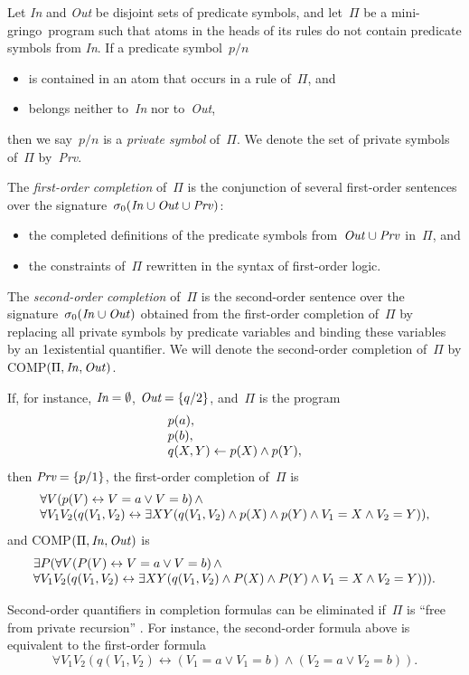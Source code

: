 \documentclass{new_tlp}
\def\ar{\leftarrow}
\def\lrar{\leftrightarrow}
\def\ba{\begin{array}}
\def\ea{\end{array}}
\def\gringo{{\sc gringo}}
\begin{document}
Let \emph{In} and \emph{Out} be disjoint sets of predicate symbols, and
let~$\Pi$ be a mini-\gringo\ program such that atoms in the heads of
its rules do not contain predicate symbols from \emph{In}.
If a predicate symbol~$p/n$
\begin{itemize}
\item is contained in an atom that occurs in a rule of~$\Pi$, and
\item belongs neither to~\emph{In} nor to~\emph{Out},
\end{itemize}
then we say~$p/n$ is a \emph{private symbol} of~$\Pi$.  We denote the
set of private symbols of~$\Pi$ by~\emph{Prv}.

The \emph{first-order completion} of~$\Pi$ is the conjunction of several
first-order sentences over the
signature~$\sigma_0(\emph{In\/}\cup\emph{Out\/}\cup\emph{Prv\/})$:
\begin{itemize}
\item the completed definitions of the predicate symbols
  from~$\emph{Out\/}\cup\emph{Prv\/}$ in~$\Pi$, and
\item the constraints of~$\Pi$ rewritten in the syntax of first-order
  logic.
\end{itemize}
The \emph{second-order completion} of~$\Pi$ is the second-order sentence
over the signature~$\sigma_0(\emph{In\/}\cup\emph{Out\/})$ obtained from
the first-order completion of~$\Pi$ by replacing all private symbols by
predicate variables and binding these variables by an 1existential quantifier.
We will denote the second-order completion of~$\Pi$ by
COMP$(\Pi,\emph{In\/},\emph{Out\/})$.

If, for instance, $\emph{In}=\emptyset$, $\emph{Out}=\{q/2\}$, and~$\Pi$
is the program
$$
\ba l
p(a),\\
p(b),\\
q(X,Y) \ar p(X) \land p(Y),
\ea$$
then $\emph{Prv}=\{p/1\}$,
the first-order completion of~$\Pi$ is
$$\ba l
\forall V(p(V) \lrar V=a \lor V=b)\,\land\\
\forall V_1V_2(q(V_1,V_2) \lrar \exists XY(q(V_1,V_2) \land p(X) \land p(Y)
\land V_1=X \land V_2=Y)),
\ea$$
and COMP$(\Pi,\emph{In\/},\emph{Out\/})$ is
$$
\ba l
\exists P(\forall V(P(V) \lrar V=a \lor V=b)\,\land\\
\forall V_1V_2(q(V_1,V_2) \lrar \exists XY(q(V_1,V_2) \land
P(X) \land P(Y) \land V_1=X \land V_2=Y))).
\ea
$$

Second-order quantifiers in completion formulas can be eliminated if~$\Pi$
is ``free from private recursion''
\cite[Section~6.4]{fan20}.  For instance, the second-order formula above
is equivalent to the first-order formula
$$
\forall V_1V_2(q(V_1,V_2) \lrar (V_1=a \lor V_1=b)\land(V_2=a \lor V_2=b)).
$$
\end{document}
